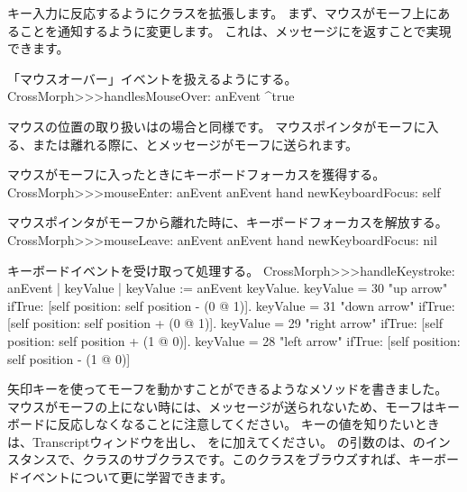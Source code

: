 \documentclass[a4paper,10pt,twoside]{book}
\begin{document}
キー入力に反応するようにクラスを拡張します。
まず、マウスがモーフ上にあることを通知するように変更します。
これは、メッセージにを返すことで実現できます。

\begin{method}{「マウスオーバー」イベントを扱えるようにする。} 
CrossMorph>>>handlesMouseOver: anEvent
	^true
\end{method}

\noindent
マウスの位置の取り扱いはの場合と同様です。
マウスポインタがモーフに入る、または離れる際に、とメッセージがモーフに送られます。

\begin{method}{マウスがモーフに入ったときにキーボードフォーカスを獲得する。}
CrossMorph>>>mouseEnter: anEvent
	anEvent hand newKeyboardFocus: self
\end{method}

\begin{method}{マウスポインタがモーフから離れた時に、キーボードフォーカスを解放する。}
CrossMorph>>>mouseLeave: anEvent
	anEvent hand newKeyboardFocus: nil
\end{method}

\begin{method}[handleKeystroke]{キーボードイベントを受け取って処理する。}
CrossMorph>>>handleKeystroke: anEvent
	| keyValue |
	keyValue := anEvent keyValue.
	keyValue = 30	 "up arrow"
		ifTrue: [self position: self position - (0 @ 1)].
	keyValue = 31	 "down arrow"
		ifTrue: [self position: self position + (0 @ 1)].
	keyValue = 29	 "right arrow"
		ifTrue: [self position: self position + (1 @ 0)].
	keyValue = 28	 "left arrow"
		ifTrue: [self position: self position - (1 @ 0)]
\end{method}

矢印キーを使ってモーフを動かすことができるようなメソッドを書きました。
マウスがモーフの上にない時には、メッセージが送られないため、モーフはキーボードに反応しなくなることに注意してください。
キーの値を知りたいときは、Transcriptウィンドウを出し、 をに加えてください。
の引数のは、のインスタンスで、クラスのサブクラスです。このクラスをブラウズすれば、キーボードイベントについて更に学習できます。
\end{document}
